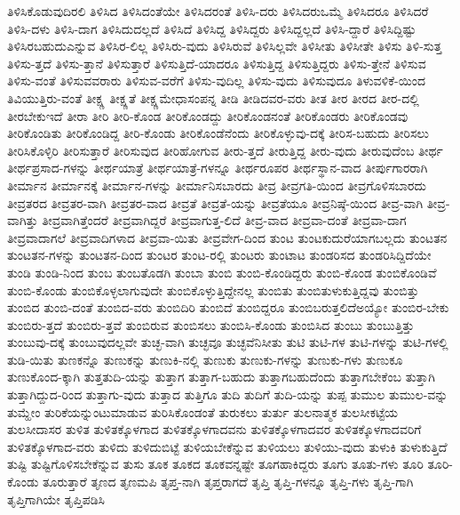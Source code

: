 {ತಿಳಿಸಿಕೊಡುವುದಿರಲಿ
ತಿಳಿಸಿದ
ತಿಳಿಸಿದಂತೆಯೇ
ತಿಳಿಸಿದರಂತೆ
ತಿಳಿಸಿ-ದರು
ತಿಳಿಸಿದರುಒಮ್ಮೆ
ತಿಳಿಸಿದರೂ
ತಿಳಿಸಿದರೆ
ತಿಳಿಸಿ-ದಳು
ತಿಳಿಸಿ-ದಾಗ
ತಿಳಿಸಿದುದಲ್ಲದೆ
ತಿಳಿಸಿದೆ
ತಿಳಿಸಿದ್ದ
ತಿಳಿಸಿದ್ದರು
ತಿಳಿಸಿದ್ದಲ್ಲದೆ
ತಿಳಿಸಿ-ದ್ದಾರೆ
ತಿಳಿಸಿದ್ದಿಷ್ಟು
ತಿಳಿಸಿರಬಹುದುಎನ್ನುವ
ತಿಳಿಸಿರ-ಲಿಲ್ಲ
ತಿಳಿಸಿರು-ವುದು
ತಿಳಿಸಿರುವೆ
ತಿಳಿಸಿಲ್ಲವೇ
ತಿಳಿಸೀತು
ತಿಳಿಸೀತೇ
ತಿಳಿಸು
ತಿಳಿ-ಸುತ್ತ
ತಿಳಿಸು-ತ್ತದೆ
ತಿಳಿಸು-ತ್ತಾನೆ
ತಿಳಿಸುತ್ತಾರೆ
ತಿಳಿಸುತ್ತಿದೆ-ಯಾದರೂ
ತಿಳಿಸುತ್ತಿದ್ದ
ತಿಳಿಸುತ್ತಿದ್ದರು
ತಿಳಿಸು-ತ್ತೇನೆ
ತಿಳಿಸುವ
ತಿಳಿಸು-ವಂತೆ
ತಿಳಿಸುವವರಾರು
ತಿಳಿಸುವ-ವರೆಗೆ
ತಿಳಿಸು-ವುದಿಲ್ಲ
ತಿಳಿಸು-ವುದು
ತಿಳಿಸುವುದೂ
ತಿಳುವಳಿಕೆ-ಯಿಂದ
ತಿವಿಯುತ್ತಿರು-ವಂತೆ
ತೀಕ್ಷ್ಣ
ತೀಕ್ಷ್ಣತೆ
ತೀಕ್ಷ್ಣಮೇಧಾಸಂಪನ್ನ
ತೀಡಿ
ತೀಡಿದವರ-ವರು
ತೀತ
ತೀರ
ತೀರದ
ತೀರ-ದಲ್ಲಿ
ತೀರಬೇಕುಇದೆ
ತೀರಾ
ತೀರಿ
ತೀರಿ-ಕೊಂಡ
ತೀರಿಕೊಂಡದ್ದು
ತೀರಿಕೊಂಡನಂತೆ
ತೀರಿಕೊಂಡರು
ತೀರಿಕೊಂಡವು
ತೀರಿಕೊಂಡಿತು
ತೀರಿಕೊಂಡಿದ್ದ
ತೀರಿ-ಕೊಂಡು
ತೀರಿಕೊಂಡೆನೆಂದು
ತೀರಿಕೊಳ್ಳುವು-ದಕ್ಕೆ
ತೀರಿಸ-ಬಹುದು
ತೀರಿಸಲು
ತೀರಿಸಿಕೊಳ್ಳಿರಿ
ತೀರಿಸುತ್ತಾರೆ
ತೀರಿಸುವುದ
ತೀರಿಹೋಗುವ
ತೀರು-ತ್ತದೆ
ತೀರುತ್ತಿದ್ದ
ತೀರು-ವುದು
ತೀರುವುದೆಂಬ
ತೀರ್ಥ
ತೀರ್ಥಪ್ರಸಾದ-ಗಳನ್ನು
ತೀರ್ಥಯಾತ್ರೆ
ತೀರ್ಥಯಾತ್ರೆ-ಗಳನ್ನೂ
ತೀರ್ಥರೂಪರ
ತೀರ್ಥಸ್ಥಾನ-ವಾದ
ತೀರ್ಪುಗಾರರಾಗಿ
ತೀರ್ಮಾನ
ತೀರ್ಮಾನಕ್ಕೆ
ತೀರ್ಮಾನ-ಗಳನ್ನು
ತೀರ್ಮಾನಿಸಬಾರದು
ತೀವ್ರ
ತೀವ್ರಗತಿ-ಯಿಂದ
ತೀವ್ರಗೊಳಿಸಬಾರದು
ತೀವ್ರತರದ
ತೀವ್ರತರ-ವಾಗಿ
ತೀವ್ರತರ-ವಾದ
ತೀವ್ರತೆ
ತೀವ್ರತೆ-ಯನ್ನು
ತೀವ್ರತೆಯೂ
ತೀವ್ರನಿಷ್ಠೆ-ಯಿಂದ
ತೀವ್ರ-ವಾಗಿ
ತೀವ್ರ-ವಾಗಿತ್ತು
ತೀವ್ರವಾಗಿತ್ತೆಂದರೆ
ತೀವ್ರವಾಗಿದ್ದರೆ
ತೀವ್ರವಾಗುತ್ತ-ಲಿದೆ
ತೀವ್ರ-ವಾದ
ತೀವ್ರವಾ-ದಂತೆ
ತೀವ್ರವಾ-ದಾಗ
ತೀವ್ರವಾದಾಗಲೆ
ತೀವ್ರವಾದಿಗಳಾದ
ತೀವ್ರವಾ-ಯಿತು
ತೀವ್ರವೇಗ-ದಿಂದ
ತುಂಟ
ತುಂಟಕುದುರೆಯಾಗಬಲ್ಲದು
ತುಂಟತನ
ತುಂಟತನ-ಗಳನ್ನು
ತುಂಟತನ-ದಿಂದ
ತುಂಟರ
ತುಂಟ-ರಲ್ಲಿ
ತುಂಟರು
ತುಂಟಾಟ
ತುಂಡರಿಸದ
ತುಂಡರಿಸಿದ್ದಿದೆಯೇ
ತುಂಡಿ
ತುಂಡಿ-ನಿಂದ
ತುಂಬ
ತುಂಬತೊಡಗಿ
ತುಂಬಾ
ತುಂಬಿ
ತುಂಬಿ-ಕೊಂಡಿದ್ದರು
ತುಂಬಿ-ಕೊಂಡ
ತುಂಬಿಕೊಂಡಿವೆ
ತುಂಬಿ-ಕೊಂಡು
ತುಂಬಿಕೊಳ್ಳಲಾಗುವುದೇ
ತುಂಬಿಕೊಳ್ಳುತ್ತಿದ್ದೇನಲ್ಲ
ತುಂಬಿತು
ತುಂಬಿತುಳುಕುತ್ತಿದ್ದವು
ತುಂಬಿತ್ತು
ತುಂಬಿದ
ತುಂಬಿ-ದಂತೆ
ತುಂಬಿದ-ವರು
ತುಂಬಿದಿರಿ
ತುಂಬಿದೆ
ತುಂಬಿದ್ದರೂ
ತುಂಬಿಬರುತ್ತಲಿದೆಅಯ್ಯೋ
ತುಂಬಿರ-ಬೇಕು
ತುಂಬಿರು-ತ್ತದೆ
ತುಂಬಿರು-ತ್ತವೆ
ತುಂಬಿರುವ
ತುಂಬಿಸಲು
ತುಂಬಿಸಿ-ಕೊಂಡು
ತುಂಬಿಸಿದ
ತುಂಬು
ತುಂಬುತ್ತಿತ್ತು
ತುಂಬುವು-ದಕ್ಕೆ
ತುಂಬುವುದಲ್ಲವೇ
ತುಚ್ಛ-ವಾಗಿ
ತುಚ್ಛವೂ
ತುಚ್ಛವೆನಿಸೀತು
ತುಟಿ
ತುಟಿ-ಗಳ
ತುಟಿ-ಗಳನ್ನು
ತುಟಿ-ಗಳಲ್ಲಿ
ತುಡಿ-ಯಿತು
ತುಣಕನ್ನೊ
ತುಣುಕನ್ನು
ತುಣುಕಿ-ನಲ್ಲಿ
ತುಣುಕು
ತುಣುಕು-ಗಳನ್ನು
ತುಣುಕು-ಗಳು
ತುಣುಕೂ
ತುಣುಕೊಂದ-ಕ್ಕಾಗಿ
ತುತ್ತತುದಿ-ಯನ್ನು
ತುತ್ತಾಗ
ತುತ್ತಾಗ-ಬಹುದು
ತುತ್ತಾಗಬಹುದೆಂದು
ತುತ್ತಾಗಬೇಕೆಂಬ
ತುತ್ತಾಗಿ
ತುತ್ತಾಗಿದ್ದುದ-ರಿಂದ
ತುತ್ತಾಗು-ವುದು
ತುತ್ತಾದ
ತುತ್ತಿಗೂ
ತುದಿ
ತುದಿಗೆ
ತುದಿ-ಯನ್ನು
ತುಪ್ಪ
ತುಮುಲ
ತುಮುಲ-ವನ್ನು
ತುಮ್ಹೇಂ
ತುರಿಕೆಯನ್ನುಂಟುಮಾಡುವ
ತುರಿಸಿಕೊಂಡಂತೆ
ತುರುಕಲು
ತುರ್ತು
ತುಲನಾತ್ಮಕ
ತುಲಸೀಕಟ್ಟೆಯ
ತುಲಸೀದಾಸರ
ತುಳಿತ
ತುಳಿತಕ್ಕೊಳಗಾದ
ತುಳಿತಕ್ಕೊಳಗಾದವನು
ತುಳಿತಕ್ಕೊಳಗಾದವರ
ತುಳಿತಕ್ಕೊಳಗಾದವರಿಗೆ
ತುಳಿತಕ್ಕೊಳಗಾದ-ವರು
ತುಳಿದು
ತುಳಿದುಬಿಟ್ಟೆ
ತುಳಿಯಬೇಕೆನ್ನುವ
ತುಳಿಯಲು
ತುಳಿಯು-ವುದು
ತುಳುಕಿ
ತುಳುಕುತ್ತಿದೆ
ತುಷ್ಟಿ
ತುಷ್ಟಿಗೊಳಿಸಬೇಕೆನ್ನುವ
ತುಸು
ತೂಕ
ತೂಕದ
ತೂಕವನ್ನಷ್ಟೇ
ತೂಗಹಾಕಿದ್ದರು
ತೂಗು
ತೂತು-ಗಳು
ತೂರಿ
ತೂರಿ-ಕೊಂಡು
ತೂರುತ್ತಾರೆ
ತೃಣದ
ತೃಣಮಪಿ
ತೃಪ್ತ-ನಾಗಿ
ತೃಪ್ತರಾಗದೆ
ತೃಪ್ತಿ
ತೃಪ್ತಿ-ಗಳನ್ನೂ
ತೃಪ್ತಿ-ಗಳು
ತೃಪ್ತಿ-ಗಾಗಿ
ತೃಪ್ತಿಗಾಗಿಯೇ
ತೃಪ್ತಿಪಡಿಸಿ
}
